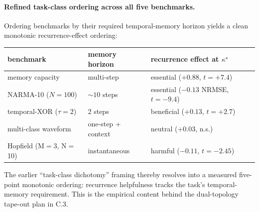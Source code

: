 \documentclass[fontsize=10pt]{article}
\begin{document}
\paragraph{Refined task-class ordering across all five benchmarks.}
Ordering benchmarks by their required temporal-memory horizon yields
a clean monotonic recurrence-effect ordering:
\begin{center}
\small
\begin{tabular}{lll}
\hline
benchmark & memory horizon & recurrence effect at $\kappa^\star$ \\
\hline
memory capacity                 & multi-step          & essential ($+0.88$, $t=+7.4$)        \\
NARMA-10 ($N=100$)              & $\sim 10$ steps     & essential ($-0.13$ NRMSE, $t=-9.4$)  \\
temporal-XOR ($\tau{=}2$)       & 2 steps             & beneficial ($+0.13$, $t=+2.7$)       \\
multi-class waveform            & one-step + context  & neutral ($+0.03$, n.s.)              \\
Hopfield (M$=$3, N$=$10)        & instantaneous       & harmful ($-0.11$, $t=-2.45$)         \\
\hline
\end{tabular}
\end{center}
The earlier ``task-class dichotomy'' framing thereby resolves into a
measured five-point monotonic ordering: recurrence helpfulness tracks
the task's temporal-memory requirement. This is the empirical content
behind the dual-topology tape-out plan in C.3.
\end{document}
